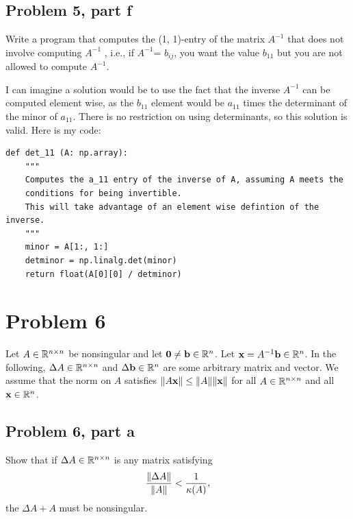\subsection{Problem 5, part f}
 Write a program that computes the (1, 1)-entry of the matrix $A^{-1}$ that does not involve computing $A^{-1}$ , i.e., if $A^{-1}$= $b_{ij}$, you want the value $b_{11}$ but you are not allowed to compute $A^{-1}$.

 \partbreak
 \begin{solution}
     I can imagine a solution would be to use the fact that the inverse $A^{-1}$ can be computed element wise, as the $b_{11}$ element would be $a_{11}$ times the determinant of the minor of $a_{11}$. There is no restriction on using determinants, so this solution is valid.  Here is my code:

     \begin{lstlisting}
def det_11 (A: np.array):
    """
    Computes the a_11 entry of the inverse of A, assuming A meets the 
    conditions for being invertible.
    This will take advantage of an element wise defintion of the inverse.
    """
    minor = A[1:, 1:]
    detminor = np.linalg.det(minor)
    return float(A[0][0] / detminor)
     \end{lstlisting}
 \end{solution}
\newpage
 \section{Problem 6}
 Let $A \in \mathbb{R}^{n\times n}$ be nonsingular and let $\textbf{0} \neq \textbf{b} \in \mathbb{R}^n$. Let $\textbf{x} = A^{-1}\textbf{b} \in \mathbb{R}^n$. In the following, $\Delta A \in \mathbb{R}^{n\times n}$ and $\Delta \textbf{b} \in \mathbb{R}^n$ are some arbitrary matrix and vector. We assume that the norm on $A$ satisfies $\norm{A\textbf{x}} \leq \norm{A}\norm{\textbf{x}}$ for all $A \in \mathbb{R}^{n\times n}$ and all $\textbf{x} \in \mathbb{R}^n$. 

 \subsection{Problem 6, part a}
 
 Show that if $\Delta A \in \mathbb{R}^{n\times n}$ is any matrix satisfying
 \[
 \frac{\norm{\Delta A}}{\norm{A}} < \frac{1}{\kappa (A)},
 \]
 the $\Delta A + A$ must be nonsingular. 


